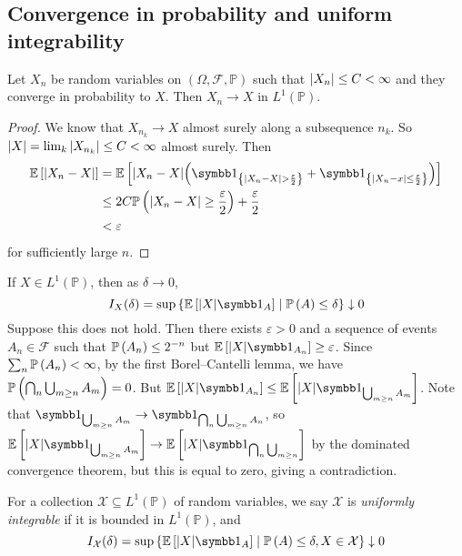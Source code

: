 \subsection{Convergence in probability and uniform integrability}
\begin{theorem}
	Let \( X_n \) be random variables on \( (\Omega, \mathcal F, \mathbb P) \) such that \( \abs{X_n} \leq C < \infty \) and they converge in probability to \( X \).
	Then \( X_n \to X \) in \( L^1(\mathbb P) \).
\end{theorem}
\begin{proof}
	We know that \( X_{n_k} \to X \) almost surely along a subsequence \( n_k \).
	So \( \abs{X} = \lim_k \abs{X_{n_k}} \leq C < \infty \) almost surely.
	Then
	\begin{align*}
		\expect{\abs{X_n - X}} &= \expect{\abs{X_n - X} \qty(\symbb 1_{\qty{\abs{X_n - X} > \frac \varepsilon 2}} + \symbb 1_{\qty{\abs{X_n - x} \leq \frac \varepsilon 2}})} \\
		&\leq 2 C \prob{\abs{X_n - X} \geq \frac{\varepsilon}{2}} + \frac \varepsilon 2 \\
		&< \varepsilon
	\end{align*}
	for sufficiently large \( n \).
\end{proof}
If \( X \in L^1(\mathbb P) \), then as \( \delta \to 0 \),
\[ I_X(\delta) = \sup \qty{ \expect{\abs{X} \symbb 1_A} \mid \prob{A} \leq \delta} \downarrow 0 \]
Suppose this does not hold.
Then there exists \( \varepsilon > 0 \) and a sequence of events \( A_n \in \mathcal F \) such that \( \mathbb{P}\left({A_n}\right) \leq 2^{-n} \) but \( \expect{\abs{X} \symbb 1_{A_n}} \geq \varepsilon \).
Since \( \sum_n \mathbb{P}\left({A_n}\right) < \infty \), by the first Borel--Cantelli lemma, we have \( \mathbb{P}\left({\bigcap_n \bigcup_{m \geq n} A_m}\right) = 0 \).
But \( \expect{\abs{X} \symbb 1_{A_n}} \leq \expect{\abs{X} \symbb 1_{\bigcup_{m \geq n} A_m}} \).
Note that \( \symbb 1_{\bigcup_{m \geq n} A_m} \to \symbb 1_{\bigcap_n \bigcup_{m \geq n} A_n} \), so \( \expect{\abs{X} \symbb 1_{\bigcup_{m \geq n} A_m}} \to \expect{\abs{X} \symbb 1_{\bigcap_n \bigcup_{m \geq n}}} \) by the dominated convergence theorem, but this is equal to zero, giving a contradiction.
\begin{definition}
	For a collection \( \mathcal X \subseteq L^1(\mathbb P) \) of random variables, we say \( \mathcal X \) is \emph{uniformly integrable} if it is bounded in \( L^1(\mathbb P) \), and
	\[ I_{\mathcal X}(\delta) = \sup \qty{ \expect{\abs{X}\symbb 1_A} \mid \prob{A} \leq \delta, X \in \mathcal X} \downarrow 0 \]
\end{definition}
